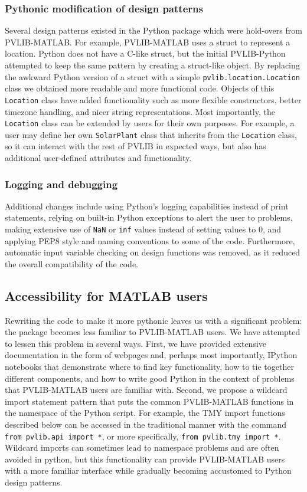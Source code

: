\documentclass[conference]{IEEEtran}
\begin{document}
\subsubsection{Pythonic modification of design patterns}
Several design patterns existed in the Python package which were hold-overs from PVLIB-MATLAB. 
For example, PVLIB-MATLAB uses a struct to represent a location. 
Python does not have a C-like struct, but the initial PVLIB-Python attempted to keep the same pattern by creating a struct-like object.
By replacing the awkward Python version of a struct with a simple \texttt{pvlib.location.Location} class we obtained more readable and more functional code.
Objects of this \texttt{Location} class have added functionality such as more flexible constructors, better timezone handling, and nicer string representations.
Most importantly, the \texttt{Location} class can be extended by users for their own purposes.
For example, a user may define her own \texttt{SolarPlant} class that inherits from the \texttt{Location} class, so it can interact with the rest of PVLIB in expected ways, but also has additional user-defined attributes and functionality.

\subsubsection{Logging and debugging}
Additional changes include using Python's logging capabilities instead of print statements, relying on built-in Python exceptions to alert the user to problems, making extensive use of \texttt{NaN} or \texttt{inf} values instead of setting values to 0, and applying PEP8 style and naming conventions \cite{pep8} to some of the code. 
Furthermore, automatic input variable checking on design functions was removed, as it reduced the overall compatibility of the code. 

\subsection{Accessibility for MATLAB users}
Rewriting the code to make it more pythonic leaves us with a significant problem: the package becomes less familiar to PVLIB-MATLAB users. 
We have attempted to lessen this problem in several ways.
First, we have provided extensive documentation in the form of webpages and, perhaps most importantly, IPython notebooks that demonstrate where to find key functionality, how to tie together different components, and how to write good Python in the context of problems that PVLIB-MATLAB users are familiar with.
Second, we propose a wildcard import statement pattern that puts the common PVLIB-MATLAB functions in the namespace of the Python script. 
For example, the TMY import functions described below can be accessed in the traditional manner with the command \texttt{from pvlib.api import *}, or more specifically, \texttt{from pvlib.tmy import *}. 
Wildcard imports can sometimes lead to namespace problems and are often avoided in python, but this functionality can provide PVLIB-MATLAB users with a more familiar interface while gradually becoming accustomed to Python design patterns.
\end{document}
